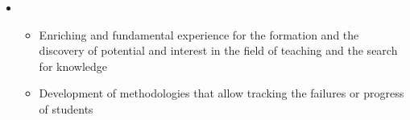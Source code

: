 \documentclass[11pt, letterpaper, sans]{moderncv}        %
\begin{document}
\begin{itemize}
			\item{
				{
					\vspace{3pt}
					\begin{itemize}
						\item Enriching and fundamental experience for the formation and the discovery of potential and interest in the field of teaching and the search for knowledge
						\item Development of methodologies that allow tracking the failures or progress of students
					\end{itemize}
				}
			}
		\end{itemize}
	\vspace{6pt}
\end{document}
